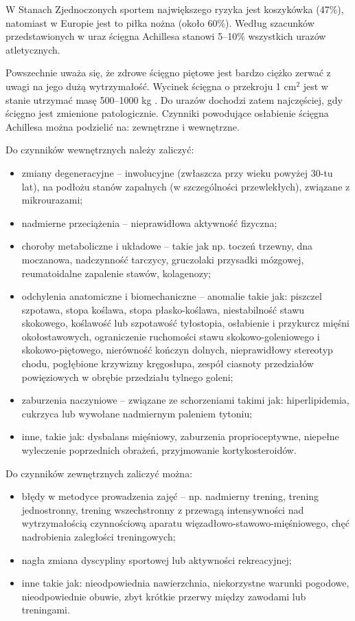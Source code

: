 \newpage
W Stanach Zjednoczonych sportem największego ryzyka jest koszykówka (47\%), natomiast w Europie jest to piłka nożna (około 60\%). Według szacunków przedstawionych w \cite{CHIRALI2014211} uraz ścięgna Achillesa stanowi 5--10\% wszystkich urazów atletycznych.

Powszechnie uważa się, że zdrowe ścięgno piętowe jest bardzo ciężko zerwać \linebreak z uwagi na jego dużą wytrzymałość. Wycinek ścięgna o przekroju 1 cm$^2$ jest \linebreak w stanie utrzymać masę 500--1000 kg \cite{Maquirriain2011}. Do urazów dochodzi zatem najczęściej, gdy ścięgno jest zmienione patologicznie. Czynniki powodujące osłabienie ścięgna Achillesa można podzielić na: zewnętrzne i wewnętrzne.

Do czynników wewnętrznych należy zaliczyć:
\begin{itemize}[noitemsep,nolistsep]
	\item zmiany degeneracyjne -- inwolucyjne (zwłaszcza przy wieku powyżej 30-tu lat), na podłożu stanów zapalnych (w szczególności przewlekłych), związane z mikrourazami;
	\item nadmierne przeciążenia -- nieprawidłowa aktywność fizyczna;
	\item choroby metaboliczne i układowe -- takie jak np. toczeń trzewny, dna moczanowa, nadczynność tarczycy, gruczolaki przysadki mózgowej, reumatoidalne zapalenie stawów, kolagenozy;
	\item odchylenia anatomiczne i biomechaniczne -- anomalie takie jak: piszczel szpotawa, stopa koślawa, stopa płasko-koślawa, niestabilność stawu skokowego, koślawość lub szpotawość tyłostopia, osłabienie i przykurcz mięśni okołostawowych, ograniczenie ruchomości stawu skokowo-goleniowego i skokowo-piętowego, nierówność kończyn dolnych, nieprawidłowy stereotyp chodu, pogłębione krzywizny kręgosłupa, zespół ciasnoty przedziałów powięziowych w obrębie przedziału tylnego goleni;
	\item zaburzenia naczyniowe -- związane ze schorzeniami takimi jak: hiperlipidemia, cukrzyca lub wywołane nadmiernym paleniem tytoniu;
	\item inne, takie jak: dysbalans mięśniowy, zaburzenia proprioceptywne, niepełne wyleczenie poprzednich obrażeń, przyjmowanie kortykosteroidów.
\end{itemize}

Do czynników zewnętrznych zaliczyć można:
\begin{itemize}[noitemsep,nolistsep]
	\item błędy w metodyce prowadzenia zajęć -- np. nadmierny trening, trening jednostronny, trening wszechstronny z przewagą intensywności nad wytrzymałością czynnościową aparatu więzadłowo-stawowo-mięśniowego, chęć nadrobienia zaległości treningowych;
	\item nagła zmiana dyscypliny sportowej lub aktywności rekreacyjnej;
	\item inne takie jak: nieodpowiednia nawierzchnia, niekorzystne warunki pogodowe, nieodpowiednie obuwie, zbyt krótkie przerwy między zawodami lub treningami.
\end{itemize}

